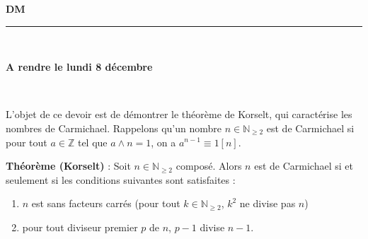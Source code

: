 \documentclass[11pt,a4paper]{article}
\title{}
\date{}
\newcommand{\HRule}{\rule{\linewidth}{0.5mm}}
\begin{document}
\pagestyle{fancy}

\fancyhead{}
 \fancyfoot{}


\newcommand{\lb}{\llbracket}
\newcommand{\rb}{\rrbracket}


\newcommand{\N}{\mathbb{N}}
\newcommand{\Z}{\mathbb{Z}}
\newcommand{\md}[3]{#1\ \equiv \ #2 \! \! \! \! \! \pmod {#3} }
\newcommand{\nmd}[3]{#1 \not \equiv #2 \! \! \! \! \!  \pmod {#3} }
\newcommand{\mda}[3]{#1 \equiv #2 \! \!  \pmod {#3} }
\newcommand{\nmda}[3]{#1 \not \equiv #2 \! \! \pmod {#3} }
\newcommand{\mo}[2]{#1 \! \! \! \! \! \pmod #2 }
\newcommand{\moa}[2]{#1 \! \!  \pmod {#2} }

\thispagestyle{fancy}

\begin{center}
    { \huge \bfseries
    DM 
     \\ [0cm] }
    \HRule \\[0.5cm]
\end{center}





\begin{center}
\textbf{A rendre  le lundi 8 décembre}
\end{center}

\

L'objet de ce devoir est de démontrer le théorème de Korselt, qui caractérise les nombres de Carmichael. Rappelons qu'un nombre $n\in \N_{\geq 2}$ est de Carmichael si pour tout $a\in \Z$ tel que $a\wedge n=1$, on a $a^{n-1}\equiv 1[n]$. 

\textbf{Théorème (Korselt)} : Soit $n\in \N_{\geq 2}$ composé. Alors $n$ est de Carmichael si et seulement si les conditions suivantes sont satisfaites : 
\begin{enumerate}
\item $n$ est sans facteurs carrés (pour tout $k\in \N_{\geq 2}$, $k^2$ ne divise pas $n$)
\item pour tout diviseur premier $p$ de $n$, $p-1$ divise $n-1$. 
\end{enumerate}
\end{document}
